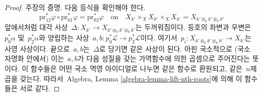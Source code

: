 \begin{proof}
\medskip\noindent
주장의 증명. 다음 등식을 확인해야 한다.
$$
\text{pr}_{12}^*\varphi \circ
\text{pr}_{01}^*\varphi =
\text{pr}_{02}^*\varphi
\quad\text{on}\quad
X_{k'} \times_X X_{k'} \times_X X_{k'} = X_{k' \otimes_k k' \otimes_k k'}
$$
앞에서처럼 대각 사상\ 
$\Delta : X_{k'} \to X_{k' \otimes_k k' \otimes_k k'}$는 두꺼워짐이다.
등호의 좌변과 우변은\ 
$p_0^*\alpha$ 및\  $p_2^*\alpha$와 양립하는 사상\ 
$a, b : p_0^*\mathcal{L} \to p_2^*\mathcal{L}$이다. 여기서\ 
$p_i : X_{k' \otimes_k k' \otimes_k k'} \to X_{k'}$는 사영 사상이다.
끝으로\  $a, b$는\  $\Delta$로 당기면 같은 사상이 된다. 아핀 국소적으로
(국소 자명화 안에서) 이는\  $a, b$가 다음 성질을 갖는 가역함수에 의한
곱셈으로 주어진다는 뜻이다. 이 함수들은 어떤 국소 멱영 아이디얼로 나누면
같은 함수로 환원되고, 같은\  $n$제곱을 갖는다. 따라서\  Algebra, Lemma
\ref{algebra-lemma-lift-nth-roots}에 의해 이 함수들은 서로 같다.
\end{proof}











